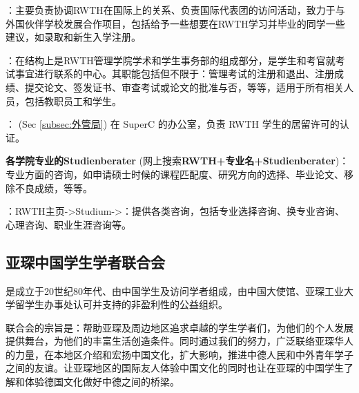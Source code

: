     \href{https://www.rwth-aachen.de/go/id/pvd/lidx/1}{}：主要负责协调RWTH在国际上的关系、负责国际代表团的访问活动，致力于与外国伙伴学校发展合作项目，包括给予一些想要在RWTH学习并毕业的同学一些建议，如录取和新生入学注册。

    \href{https://www.rwth-aachen.de/cms/root/Die-RWTH/Einrichtungen/Verwaltung/Dezernate/Akademische-und-studentische-Angelegenhe/~rcv/Abteilung-1-3-Zentrales-Pruefungsamt/}{}：在结构上是RWTH管理学院学术和学生事务部的组成部分，是学生和考官就考试事宜进行联系的中心。其职能包括但不限于：管理考试的注册和退出、注册成绩、提交论文、签发证书、审查考试或论文的批准与否，等等，适用于所有相关人员，包括教职员工和学生。

    \href{https://www.rwth-aachen.de/cms/root/studium/Vor-dem-Studium/Internationale-Studierende/Organisation-des-Studienaufenthaltes/Visum-Aufenthaltsrecht/~bpte/Aufenthaltserlaubnis/}{}：  (Sec \ref{subsec:外管局}) 在 SuperC 的办公室，负责 RWTH 学生的居留许可的认证。

    \textbf{各学院专业的Studienberater} (网上搜索\textbf{RWTH+专业名+Studienberater})：专业方面的咨询，如申请硕士时候的课程匹配度、研究方向的选择、毕业论文、移除不良成绩，等等。

    ：RWTH主页->Studium->\href{https://www.rwth-aachen.de/cms/root/Studium/~hzvj/Beratung-Hilfe/}{}：提供各类咨询，包括专业选择咨询、换专业咨询、心理咨询、职业生涯咨询等。

  \subsection{亚琛中国学生学者联合会}\label{subsec:亚琛中国学生学者联合会}

    \href{http://www.vcwsa.rwth-aachen.de/}{}是成立于20世纪80年代、由中国学生及访问学者组成，由中国大使馆、亚琛工业大学留学生办事处认可并支持的非盈利性的公益组织。

    联合会的宗旨是：帮助亚琛及周边地区追求卓越的学生学者们，为他们的个人发展提供舞台，为他们的丰富生活创造条件。同时通过我们的努力，广泛联络亚琛华人的力量，在本地区介绍和宏扬中国文化，扩大影响，推进中德人民和中外青年学子之间的友谊。让亚琛地区的国际友人体验中国文化的同时也让在亚琛的中国学生了解和体验德国文化做好中德之间的桥梁。

